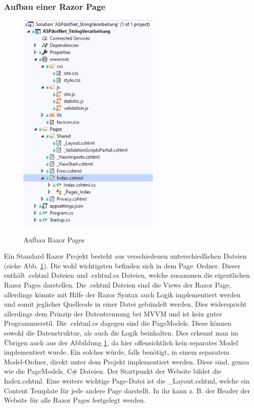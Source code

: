 \documentclass[a4paper,
12pt,
oneside]
{article}
\begin{document}
	\subsubsection{Aufbau einer Razor Page}
	\begin{figure}
		\centering
		\caption{Aufbau Razor Pages} 
		\includegraphics[width=7cm]{img/aufbau.jpg} \\
		\label{fig:aufbau}
	\end{figure}
	Ein Standard Razor Projekt besteht aus verschiedenen unterschiedlichen Dateien (siehe Abb. \ref{fig:aufbau}). Die wohl wichtigsten befinden sich in dem \glqq Page\grqq~Ordner. Dieser enthält .cshtml Dateien und .cshtml.cs Dateien, welche zusammen die eigentlichen Razor Pages darstellen. Die .cshtml Dateien sind die Views der Razor Page, allerdings könnte mit Hilfe der Razor Syntax auch Logik implementiert werden und somit jeglicher Quellcode in einer Datei gebündelt werden. Dies widerspricht allerdings dem Prinzip der Datentrennung bei MVVM und ist kein guter Programmierstil. Die .cshtml.cs dagegen sind die PageModels. Diese können sowohl die Datenstruktur, als auch die Logik beinhalten. Dies erkennt man im Übrigen auch aus der Abbildung \ref{fig:aufbau}, da hier offensichtlich kein separates Model implementiert wurde. Ein solches würde, falls benötigt, in einem separatem Model-Ordner, direkt unter dem Projekt implementiert werden. Diese sind, genau wie die PageModels, C\# Dateien. Der Startpunkt der Website bildet die Index.cshtml. Eine weitere wichtige Page-Datei ist die \_Layout.cshtml, welche ein Content Template für jede andere Page darstellt. In ihr kann z. B. der Header der Website für alle Razor Pages festgelegt werden. \\
\end{document}
